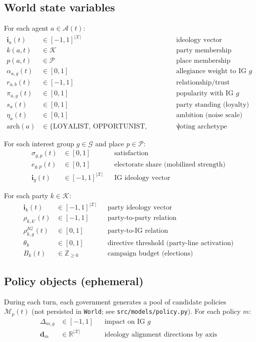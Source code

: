 \documentclass[11pt]{article}
\begin{document}
\subsection{World state variables}
For each agent $a \in \mathcal{A}(t)$:
\begin{align*}
  \mathbf{i}_a(t) &\in [-1,1]^{|\mathcal{X}|} &&\text{ideology vector} \\
  k(a,t) &\in \mathcal{K} &&\text{party membership} \\
  p(a,t) &\in \mathcal{P} &&\text{place membership} \\
  \alpha_{a,g}(t) &\in [0,1] &&\text{allegiance weight to IG } g \\
  r_{a,b}(t) &\in [-1,1] &&\text{relationship/trust (directed)} \\
  \pi_{a,g}(t) &\in [0,1] &&\text{popularity with IG } g \\
  s_a(t) &\in [0,1] &&\text{party standing (loyalty)} \\
  \eta_a(t) &\in [0,1] &&\text{ambition (noise scale)} \\
  \text{arch}(a) &\in \{\text{LOYALIST, OPPORTUNIST, IDEOLOGUE}\} &&\text{voting archetype}
\end{align*}

For each interest group $g \in \mathcal{G}$ and place $p \in \mathcal{P}$:
\begin{align*}
  \sigma_{g,p}(t) &\in [0,1] &&\text{satisfaction} \\
  e_{g,p}(t) &\in [0,1] &&\text{electorate share (mobilized strength)} \\
  \mathbf{i}_g(t) &\in [-1,1]^{|\mathcal{X}|} &&\text{IG ideology vector}
\end{align*}

For each party $k \in \mathcal{K}$:
\begin{align*}
  \mathbf{i}_k(t) &\in [-1,1]^{|\mathcal{X}|} &&\text{party ideology vector} \\
  \rho_{k,k'}(t) &\in [-1,1] &&\text{party-to-party relation} \\
  \rho^{IG}_{k,g}(t) &\in [0,1] &&\text{party-to-IG relation} \\
  \theta_k &\in [0,1] &&\text{directive threshold (party-line activation)} \\
  B_k(t) &\in \mathbb{Z}_{\ge 0} &&\text{campaign budget (elections)}
\end{align*}

\subsection{Policy objects (ephemeral)}
During each turn, each government generates a pool of candidate policies
$\mathcal{M}_p(t)$ (not persisted in \texttt{World}; see \texttt{src/models/policy.py}).
For each policy $m$:
\begin{align*}
  \Delta_{m,g} &\in [-1,1] &&\text{impact on IG } g \\
  \mathbf{d}_m &\in \mathbb{R}^{|\mathcal{X}|} &&\text{ideology alignment directions by axis}
\end{align*}
\end{document}
